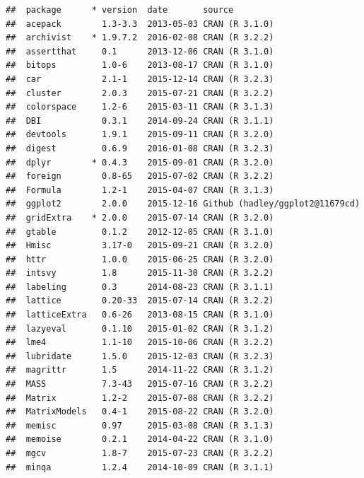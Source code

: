 \documentclass[nojss]{jss}\usepackage[]{graphicx}\usepackage[]{color}
\makeatletter
\newenvironment{kframe}{%
 \def\at@end@of@kframe{}%
 \ifinner\ifhmode%
  \def\at@end@of@kframe{\end{minipage}}%
  \begin{minipage}{\columnwidth}%
 \fi\fi%
 \def\FrameCommand##1{\hskip\@totalleftmargin \hskip-\fboxsep
 \colorbox{shadecolor}{##1}\hskip-\fboxsep
     \hskip-\linewidth \hskip-\@totalleftmargin \hskip\columnwidth}%
 \MakeFramed {\advance\hsize-\width
   \@totalleftmargin\z@ \linewidth\hsize
   \@setminipage}}%
 {\par\unskip\endMakeFramed%
 \at@end@of@kframe}
\newenvironment{knitrout}{}{} %
\makeatother
\begin{document}
\begin{knitrout}
\begin{kframe}
{\ttfamily\noindent\itshape\color{messagecolor}{\#\# Packages ------------------------------------------------------------------}}\begin{verbatim}
##  package      * version  date       source                         
##  acepack        1.3-3.3  2013-05-03 CRAN (R 3.1.0)                 
##  archivist    * 1.9.7.2  2016-02-08 CRAN (R 3.2.2)                 
##  assertthat     0.1      2013-12-06 CRAN (R 3.1.0)                 
##  bitops         1.0-6    2013-08-17 CRAN (R 3.1.0)                 
##  car            2.1-1    2015-12-14 CRAN (R 3.2.3)                 
##  cluster        2.0.3    2015-07-21 CRAN (R 3.2.2)                 
##  colorspace     1.2-6    2015-03-11 CRAN (R 3.1.3)                 
##  DBI            0.3.1    2014-09-24 CRAN (R 3.1.1)                 
##  devtools       1.9.1    2015-09-11 CRAN (R 3.2.0)                 
##  digest         0.6.9    2016-01-08 CRAN (R 3.2.3)                 
##  dplyr        * 0.4.3    2015-09-01 CRAN (R 3.2.0)                 
##  foreign        0.8-65   2015-07-02 CRAN (R 3.2.2)                 
##  Formula        1.2-1    2015-04-07 CRAN (R 3.1.3)                 
##  ggplot2        2.0.0    2015-12-16 Github (hadley/ggplot2@11679cd)
##  gridExtra    * 2.0.0    2015-07-14 CRAN (R 3.2.0)                 
##  gtable         0.1.2    2012-12-05 CRAN (R 3.1.0)                 
##  Hmisc          3.17-0   2015-09-21 CRAN (R 3.2.0)                 
##  httr           1.0.0    2015-06-25 CRAN (R 3.2.0)                 
##  intsvy         1.8      2015-11-30 CRAN (R 3.2.2)                 
##  labeling       0.3      2014-08-23 CRAN (R 3.1.1)                 
##  lattice        0.20-33  2015-07-14 CRAN (R 3.2.2)                 
##  latticeExtra   0.6-26   2013-08-15 CRAN (R 3.1.0)                 
##  lazyeval       0.1.10   2015-01-02 CRAN (R 3.1.2)                 
##  lme4           1.1-10   2015-10-06 CRAN (R 3.2.2)                 
##  lubridate      1.5.0    2015-12-03 CRAN (R 3.2.3)                 
##  magrittr       1.5      2014-11-22 CRAN (R 3.1.2)                 
##  MASS           7.3-43   2015-07-16 CRAN (R 3.2.2)                 
##  Matrix         1.2-2    2015-07-08 CRAN (R 3.2.2)                 
##  MatrixModels   0.4-1    2015-08-22 CRAN (R 3.2.0)                 
##  memisc         0.97     2015-03-08 CRAN (R 3.1.3)                 
##  memoise        0.2.1    2014-04-22 CRAN (R 3.1.0)                 
##  mgcv           1.8-7    2015-07-23 CRAN (R 3.2.2)                 
##  minqa          1.2.4    2014-10-09 CRAN (R 3.1.1)                 

\end{verbatim}
\end{kframe}
\end{knitrout}
\end{document}
